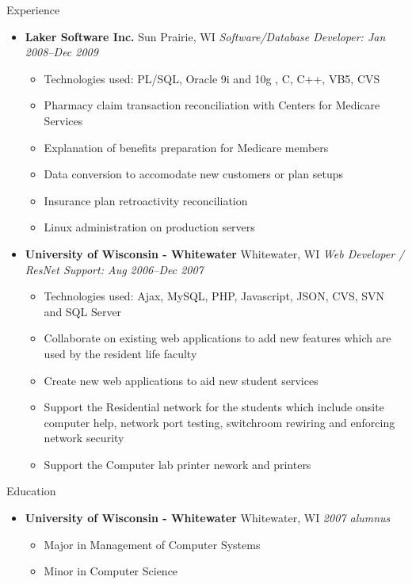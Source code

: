 \documentclass[11pt,oneside]{article}
\newenvironment{ressection}[1]{
	\vspace{4pt}
	{\fontfamily{phv}\selectfont\Large#1}
	\begin{itemize}
	\vspace{3pt}
}{
	\end{itemize}
}
\newcommand{\resitem}[1]{
	\vspace{-4pt}
	\item \begin{flushleft} #1 \end{flushleft}
}
\newcommand{\ressubitem}[1]{
	\vspace{-1pt}
	\item \begin{flushleft} #1 \end{flushleft}
}
\newcommand{\resbigitem}[3]{
	\vspace{-5pt}
	\item
	\textbf{#1} #2 \textit{#3}
}
\newenvironment{ressubsec}[3]{
	\resbigitem{#1}{#2}{#3}
	\vspace{-2pt}
	\begin{itemize}
}{
	\end{itemize}
}
\begin{document}
\begin{ressection}{Experience}
	\begin{ressubsec}{Laker Software Inc.}{Sun Prairie, WI}{Software/Database Developer: Jan 2008--Dec 2009}
		\ressubitem{Technologies used: PL/SQL, Oracle 9i and 10g , C, C++, VB5, CVS}
		\ressubitem{Pharmacy claim transaction reconciliation with Centers for Medicare Services}
		\ressubitem{Explanation of benefits preparation for Medicare members}
		\ressubitem{Data conversion to accomodate new customers or plan setups}
		\ressubitem{Insurance plan retroactivity reconciliation}
		\ressubitem{Linux administration on production servers}
	\end{ressubsec}

	\begin{ressubsec}{University of Wisconsin - Whitewater}{Whitewater, WI}{Web Developer / ResNet Support: Aug 2006--Dec 2007}
		\ressubitem{Technologies used: Ajax, MySQL, PHP, Javascript, JSON, CVS, SVN and SQL Server}
		\ressubitem{Collaborate on existing web applications to add new features which are used by the resident life faculty}
		\ressubitem{Create new web applications to aid new student services}
		\ressubitem{Support the Residential network for the students which include onsite computer help, network port testing, switchroom rewiring and enforcing network security}
		\ressubitem{Support the Computer lab printer nework and printers}
	\end{ressubsec}
	
\end{ressection}

\begin{ressection}{Education}

	\begin{ressubsec}{University of Wisconsin - Whitewater}{Whitewater, WI}{2007 alumnus}
		\ressubitem{Major in Management of Computer Systems}
		\ressubitem{Minor in Computer Science}
	\end{ressubsec}

\end{ressection}



%
%
\end{document}
